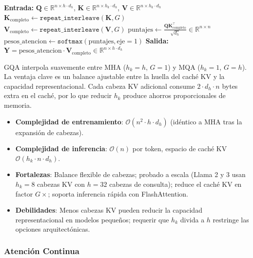 \begin{algorithmic}[1]
\State \textbf{Entrada:} $\mathbf{Q} \in \mathbb{R}^{n \times h \cdot d_h}$, $\mathbf{K} \in \mathbb{R}^{n \times h_k \cdot d_h}$, $\mathbf{V} \in \mathbb{R}^{n \times h_k \cdot d_h}$
\State $\mathbf{K}_{\text{completo}} \gets \texttt{repeat\_interleave}(\mathbf{K}, G)$ 
\State $\mathbf{V}_{\text{completo}} \gets \texttt{repeat\_interleave}(\mathbf{V}, G)$
\State $\text{puntajes} \gets \frac{\mathbf{Q}\mathbf{K}_{\text{completo}}^\top}{\sqrt{d_h}} \in \mathbb{R}^{n \times n}$ 
\State $\text{pesos\_atencion} \gets \texttt{softmax}(\text{puntajes}, \text{eje}=1)$
\State \textbf{Salida:} $\mathbf{Y} = \text{pesos\_atencion} \cdot \mathbf{V}_{\text{completo}} \in \mathbb{R}^{n \times h \cdot d_h}$
\end{algorithmic}

GQA interpola suavemente entre MHA ($h_k = h$, $G = 1$) y MQA ($h_k = 1$, $G = h$). La ventaja clave es un balance ajustable entre la huella del caché KV y la capacidad representacional. Cada cabeza KV adicional consume $2 \cdot d_h \cdot n$ bytes extra en el caché, por lo que reducir $h_k$ produce ahorros proporcionales de memoria.

\begin{itemize}[leftmargin=*]
    \item \textbf{Complejidad de entrenamiento}: $\mathcal{O}(n^2 \cdot h \cdot d_h)$ (idéntico a MHA tras la expansión de cabezas).
    \item \textbf{Complejidad de inferencia}: $\mathcal{O}(n)$ por token, espacio de caché KV $\mathcal{O}(h_k \cdot n \cdot d_h)$.
    \item \textbf{Fortalezas}: Balance flexible de cabezas; probado a escala (Llama 2 y 3 usan $h_k = 8$ cabezas KV con $h = 32$ cabezas de consulta); reduce el caché KV en factor $G \times$; soporta inferencia rápida con FlashAttention.
    \item \textbf{Debilidades}: Menos cabezas KV pueden reducir la capacidad representacional en modelos pequeños; requerir que $h_k$ divida a $h$ restringe las opciones arquitectónicas.
\end{itemize}

\subsubsection{Atención Continua}


